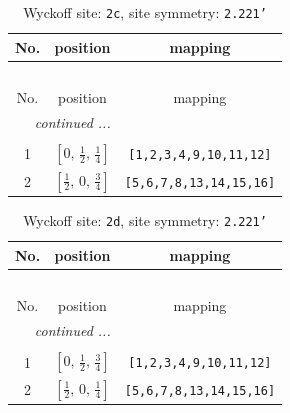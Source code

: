 \documentclass[fleqn,8pt]{jsarticle}
\begin{document}
\renewcommand{\arraystretch}{1.2}
\begin{longtable}{ccc}
\caption{Wyckoff site: {\tt 2c}, site symmetry: {\tt 2.221'}}
 \\
 \hline \hline
No. & position & mapping \\ \hline \endfirsthead

\multicolumn{2}{l}{\tablename\ \thetable{}} \\
 \hline \hline
No. & position & mapping \\ \hline \endhead

 \hline \hline
\multicolumn{2}{r}{\footnotesize\it continued ...} \\ \endfoot

 \hline \hline
\multicolumn{2}{r}{} \\ \endlastfoot

1 & $\left[ 0,\, \frac{1}{2},\, \frac{1}{4} \right]$ & {\tt [1,2,3,4,9,10,11,12]} \\ \hline
2 & $\left[ \frac{1}{2},\, 0,\, \frac{3}{4} \right]$ & {\tt [5,6,7,8,13,14,15,16]} \\
\end{longtable}
\renewcommand{\arraystretch}{1.2}
\begin{longtable}{ccc}
\caption{Wyckoff site: {\tt 2d}, site symmetry: {\tt 2.221'}}
 \\
 \hline \hline
No. & position & mapping \\ \hline \endfirsthead

\multicolumn{2}{l}{\tablename\ \thetable{}} \\
 \hline \hline
No. & position & mapping \\ \hline \endhead

 \hline \hline
\multicolumn{2}{r}{\footnotesize\it continued ...} \\ \endfoot

 \hline \hline
\multicolumn{2}{r}{} \\ \endlastfoot

1 & $\left[ 0,\, \frac{1}{2},\, \frac{3}{4} \right]$ & {\tt [1,2,3,4,9,10,11,12]} \\ \hline
2 & $\left[ \frac{1}{2},\, 0,\, \frac{1}{4} \right]$ & {\tt [5,6,7,8,13,14,15,16]} \\
\end{longtable}
\renewcommand{\arraystretch}{1.2}
\end{document}

